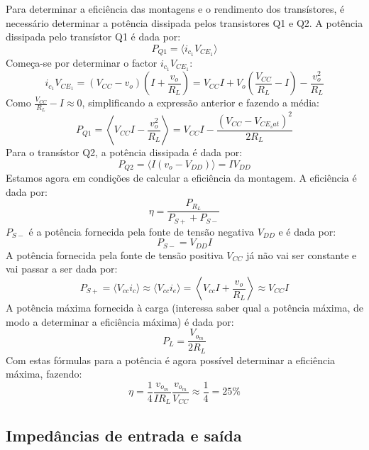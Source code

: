 \documentclass[%
  reprint,
  nofootinbib,
  amsmath,amssymb,
  aps,
  10pt,
  a4paper
]{revtex4-1}
\begin{document}
Para determinar a eficiência das montagens e o rendimento dos transístores, é necessário determinar a potência dissipada pelos transistores Q1 e Q2.
A potência dissipada pelo transístor Q1 é dada por:
\begin{equation}
P_{Q1}=\langle i_{c_1} V_{{CE}_1}\rangle
\end{equation}
Começa-se por determinar o factor $i_{c_1} V_{{CE}_1}$:
\begin{equation}
i_{c_1} V_{{CE}_1}=(V_{CC}-v_o)\left(I+\frac{v_o}{R_L}\right)=V_{CC}I+V_o\left(\frac{V_{CC}}{R_L}-I\right)-\frac{v_o^2}{R_L}
\end{equation}
Como $\frac{V_{CC}}{R_L}-I\approx0$, simplificando a expressão anterior e fazendo a média:
\begin{equation}
P_{Q1}=\left\langle V_{CC}I-\frac{v_o^2}{R_L} \right\rangle=V_{CC}I-\frac{(V_{CC}-V_{{CE}_sat})^2}{2R_L}
\end{equation}
Para o transístor Q2, a potência dissipada é dada por:
\begin{equation}
P_{Q2}=\langle I(v_o-V_{DD}) \rangle=IV_{DD}
\end{equation}
Estamos agora em condições de calcular a eficiência da montagem. A eficiência é dada por:
\begin{equation}
\eta=\frac{P_{R_L}}{P_{S+}+P_{S-}}
\end{equation}
$P_{S-}$ é a potência fornecida pela fonte de tensão negativa $V_{DD}$ e é dada por:
\begin{equation}
P_{S-}=V_{DD}I
\end{equation}
A potência fornecida pela fonte de tensão positiva $V_{CC}$ já não vai ser constante e vai passar a ser dada por:
\begin{equation}
P_{S+}=\langle V_{cc} i_c \rangle \approx \langle V_{cc} i_e \rangle =\left\langle V_{cc} I+\frac{v_o}{R_L} \right\rangle \approx V_{CC}I
\end{equation}
A potência máxima fornecida à carga (interessa saber qual a potência máxima, de modo a determinar a eficiência máxima) é dada por:
\begin{equation}
P_{L}=\frac{V_{o_m}}{2R_L}
\end{equation}
Com estas fórmulas para a potência é agora possível determinar a eficiência máxima, fazendo:
\begin{equation}
\eta=\frac{1}{4}\frac{v_{o_m}}{IR_L}\frac{v_{o_m}}{V_{CC}}\approx\frac{1}{4}=25\%
\end{equation}

\subsection{Impedâncias de entrada e saída}
\end{document}
